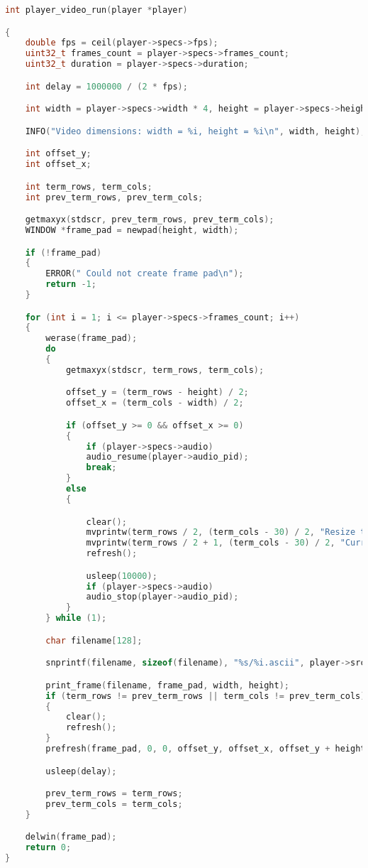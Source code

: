 \documentclass[a4paper,12pt]{article}
\begin{document}
\begin{lstlisting}[language=c]
int player_video_run(player *player)

{
    double fps = ceil(player->specs->fps);
    uint32_t frames_count = player->specs->frames_count;
    uint32_t duration = player->specs->duration;

    int delay = 1000000 / (2 * fps);

    int width = player->specs->width * 4, height = player->specs->height;

    INFO("Video dimensions: width = %i, height = %i\n", width, height);

    int offset_y;
    int offset_x;

    int term_rows, term_cols;
    int prev_term_rows, prev_term_cols;

    getmaxyx(stdscr, prev_term_rows, prev_term_cols);
    WINDOW *frame_pad = newpad(height, width);

    if (!frame_pad)
    {
        ERROR(" Could not create frame pad\n");
        return -1;
    }

    for (int i = 1; i <= player->specs->frames_count; i++)
    {
        werase(frame_pad);
        do
        {
            getmaxyx(stdscr, term_rows, term_cols);

            offset_y = (term_rows - height) / 2;
            offset_x = (term_cols - width) / 2;

            if (offset_y >= 0 && offset_x >= 0)
            {
                if (player->specs->audio)
                audio_resume(player->audio_pid);
                break;
            }
            else
            {

                clear();
                mvprintw(term_rows / 2, (term_cols - 30) / 2, "Resize terminal to %dx%d", width, height);
                mvprintw(term_rows / 2 + 1, (term_cols - 30) / 2, "Current: %dx%d", term_cols, term_rows);
                refresh();

                usleep(10000);
                if (player->specs->audio)
                audio_stop(player->audio_pid);
            }
        } while (1);

        char filename[128];

        snprintf(filename, sizeof(filename), "%s/%i.ascii", player->src, i);

        print_frame(filename, frame_pad, width, height);
        if (term_rows != prev_term_rows || term_cols != prev_term_cols)
        {
            clear();
            refresh();
        }
        prefresh(frame_pad, 0, 0, offset_y, offset_x, offset_y + height - 1, offset_x + width - 1);

        usleep(delay);

        prev_term_rows = term_rows;
        prev_term_cols = term_cols;
    }

    delwin(frame_pad);
    return 0;
}
\end{lstlisting}
\end{document}
